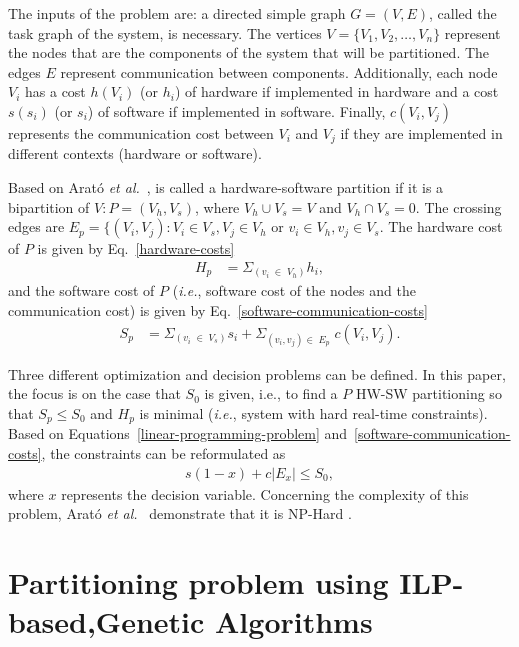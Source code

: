 The inputs of the problem are: a directed simple graph $ G = (V,E) $, called the task graph of the system, is necessary. The vertices $V = \{V_1,V_2,\dotso,V_n\}$ represent the nodes that are the components of the system that will be partitioned. The edges $E$ represent communication between components. Additionally, each node  $V_i$ has a cost $h(V_i)$ (or $h_i$) of hardware if implemented in hardware and a cost $s(s_i)$ (or $ s_i $) of software if implemented in software. Finally, $c(V_i,V_j)$ represents the communication cost between $V_i$ and $V_j$ if they are implemented in different contexts (hardware or software).

Based on Arat\'o {\it et al.}~\cite{Arato2003}, is called a hardware-software partition if it is a bipartition of $V:P = (V_h, V_s)$, where $V_h \cup V_s = V$  and $V_h \cap V_s = 0$. The crossing edges are $E_p = \{(V_i,V_j):V_i \in V_s, V_j \in V_h$ or $v_i \in V_h, v_j \in V_s $. The hardware cost of $P$ is given by Eq.~\ref{hardware-costs}
%
\begin{align}
\label{hardware-costs}
 H_p &= \Sigma_{\left(v_i \;\in\; V_h\right)} h_i,
\end{align}
%
\noindent and the software cost of $P$ ({\it i.e.}, software cost of the nodes and the communication cost) is given by Eq.~\ref{software-communication-costs}
%
\begin{align}
\label{software-communication-costs}
  S_p &= \Sigma_{\left(v_i \;\in\; V_s\right)} s_i + \Sigma_{(v_i,v_j) \in\; E_p}\; c(V_i, V_j).
\end{align}

Three different optimization and decision problems can be defined. In this paper, the focus is on the case that $ S_0 $ is given, i.e., to find a $P$ HW-SW partitioning so that $ S_p \leq S_0 $ and $ H_p $ is minimal ({\it i.e.}, system with hard real-time constraints). Based on Equations~\ref{linear-programming-problem} and~\ref{software-communication-costs}, the constraints can be reformulated as 
%
\begin{align}
\label{hw-sw-partitioning}
s\left(1-x\right) + c|E_x| \leq S_0, 
\end{align}
%
\noindent where $x$ represents the decision variable. Concerning the complexity of this problem, Arat\'o {\it et al.}~\cite{Arato2003} demonstrate that it is NP-Hard \textcolor{red}{\cite[p.~763]{Cormem}}.

\section{Partitioning problem using ILP-based,Genetic Algorithms}
\label{ILPGA}

